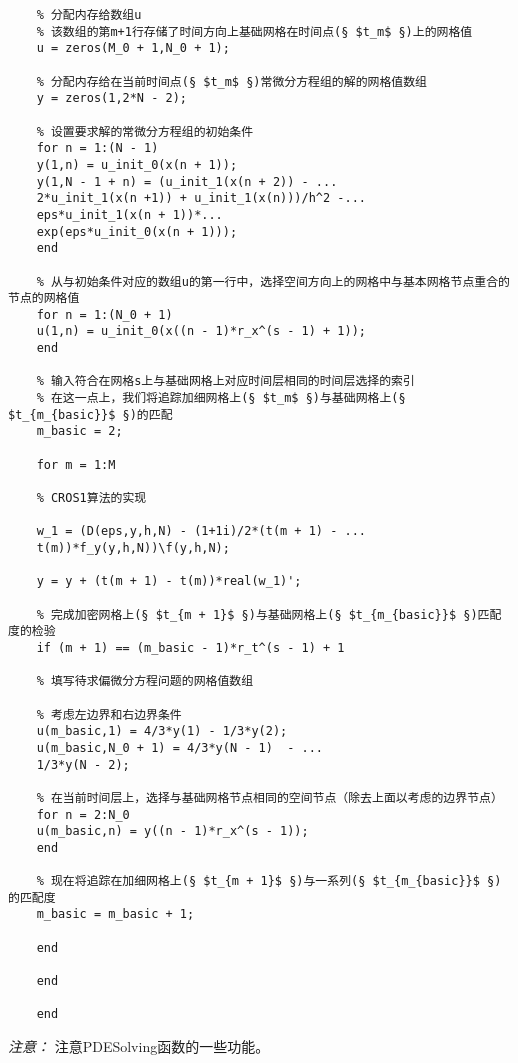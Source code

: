 \documentclass[twoside]{book}
\begin{document}
\begin{CJK*}{GBK}{song}
\begin{lstlisting}
	% 分配内存给数组u
	% 该数组的第m+1行存储了时间方向上基础网格在时间点(§ $t_m$ §)上的网格值
	u = zeros(M_0 + 1,N_0 + 1);
	
	% 分配内存给在当前时间点(§ $t_m$ §)常微分方程组的解的网格值数组
	y = zeros(1,2*N - 2);
	
	% 设置要求解的常微分方程组的初始条件
	for n = 1:(N - 1)
	y(1,n) = u_init_0(x(n + 1));
	y(1,N - 1 + n) = (u_init_1(x(n + 2)) - ...
	2*u_init_1(x(n +1)) + u_init_1(x(n)))/h^2 -...
	eps*u_init_1(x(n + 1))*...
	exp(eps*u_init_0(x(n + 1)));
	end
	
	% 从与初始条件对应的数组u的第一行中，选择空间方向上的网格中与基本网格节点重合的节点的网格值
	for n = 1:(N_0 + 1)
	u(1,n) = u_init_0(x((n - 1)*r_x^(s - 1) + 1));
	end
	
	% 输入符合在网格s上与基础网格上对应时间层相同的时间层选择的索引
	% 在这一点上，我们将追踪加细网格上(§ $t_m$ §)与基础网格上(§ $t_{m_{basic}}$ §)的匹配
	m_basic = 2;
	
	for m = 1:M
	
	% CROS1算法的实现
	
	w_1 = (D(eps,y,h,N) - (1+1i)/2*(t(m + 1) - ...
	t(m))*f_y(y,h,N))\f(y,h,N);
	
	y = y + (t(m + 1) - t(m))*real(w_1)';
	
	% 完成加密网格上(§ $t_{m + 1}$ §)与基础网格上(§ $t_{m_{basic}}$ §)匹配度的检验
	if (m + 1) == (m_basic - 1)*r_t^(s - 1) + 1
	
	% 填写待求偏微分方程问题的网格值数组
	
	% 考虑左边界和右边界条件
	u(m_basic,1) = 4/3*y(1) - 1/3*y(2);
	u(m_basic,N_0 + 1) = 4/3*y(N - 1)  - ...
	1/3*y(N - 2);
	
	% 在当前时间层上，选择与基础网格节点相同的空间节点（除去上面以考虑的边界节点）
	for n = 2:N_0
	u(m_basic,n) = y((n - 1)*r_x^(s - 1));
	end
	
	% 现在将追踪在加细网格上(§ $t_{m + 1}$ §)与一系列(§ $t_{m_{basic}}$ §)的匹配度
	m_basic = m_basic + 1;
	
	end
	
	end
	
	end
	\end{lstlisting}


\emph{注意：} 注意PDESolving函数的一些功能。


\end{CJK*}
\end{document}
